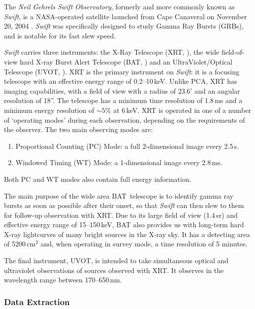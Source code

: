 \par The \textit{Neil Gehrels Swift Observatory}\indexswift, formerly and more commonly known as \textit{Swift}, is a NASA-operated satellite launched from Cape Canaveral on November 20, 2004 \citep{Gehrels_Swift}.  \textit{Swift} was specifically designed to study Gamma Ray Bursts (GRBs), and is notable for its fast slew speed.
\par \textit{Swift} carries three instruments: the X-Ray Telescope (XRT\indexxrt, \citealp{Burrows_XRT}), the wide field-of-view hard X-ray Burst Alert Telescope (BAT\indexbat, \citealp{Krimm_BAT}) and an UltraViolet/Optical Telescope (UVOT\indexuvot, \citealp{Roming_UVOT}).  XRT is the primary instrument on \textit{Swift}: it is a focusing telescope with an effective energy range of 0.2--10\,keV.  Unlike PCA, XRT has imaging capabilities, with a field of view with a radius of 23.6' and an angular resolution of 18''.  The telescope has a minimum time resolution of 1.8\,ms and a minimum energy resolution of $\sim5$\% at 6\,keV.  XRT is operated in one of a number of `operating modes' during each observation, depending on the requirements of the observer.  The two main observing modes are:
\begin{enumerate}
\item Proportional Counting (PC) Mode: a full 2-dimensional image every 2.5\,s.
\item Windowed Timing (WT) Mode: a 1-dimensional image every 2.8\,ms.
\end{enumerate}
Both PC and WT modes also contain full energy information.
\par The main purpose of the wide area BAT\indexbat\ telescope is to identify gamma ray bursts as soon as possible after their onset, so that \textit{Swift} can then slew to them for follow-up observation with XRT.  Due to its large field of view (1.4\,sr) and effective energy range of 15--150\,keV, BAT also provides us with long-term hard X-ray lightcurves of many bright sources in the X-ray sky.  It has a detecting area of 5200\,cm$^2$ and, when operating in survey mode, a time resolution of 5 minutes.
\par The final instrument, UVOT\indexuvot, is intended to take simultaneous optical and ultraviolet observations of sources observed with XRT\indexxrt.  It observes in the wavelength range between 170--650\,nm.

\subsubsection{Data Extraction}

